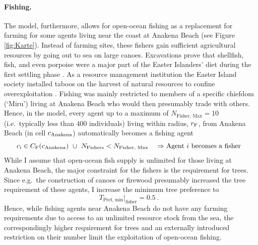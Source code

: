 \paragraph{Fishing.}
The model, furthermore, allows for open-ocean fishing as a replacement for farming for some agents living near the coast at Anakena Beach (see Figure \ref{fig:Karte}).
Instead of farming sites, these fishers gain sufficient agricultural resources by going out to sea on large canoes.
Excavations prove that shellfish, fish, and even porpoise were a major part of the Easter Islanders' diet during the first settling phase \citep{Bahn2017}.
As a resource management institution the Easter Island society installed taboos on the harvest of natural resources to confine overexploitation \citep{Good2006}. 
Fishing was mainly restricted to members of a specific chiefdom (`Miru') living at Anakena Beach \citep{Bahn2017} who would then presumably trade with others.
Hence, in the model, every agent up to a maximum of $N_\text{Fisher, Max} = 10$ (i.e.\ typically less than $400$ individuals) living within radius, $r_{\rm F}$, from Anakena Beach (in cell $c_{\rm Anakena}$) automatically becomes a fishing agent
\begin{equation}
 	c_{\rm i} \in C_{\rm F}(c_{\rm Anakena}) \  \cup \ N_\text{Fishers}<N_\text{Fisher, Max} \quad \Rightarrow \text{Agent }i\text{ becomes a fisher}
\end{equation}
While I assume that open-ocean fish supply is unlimited for those living at Anakena Beach, the major constraint for the fishers is the requirement for trees.
Since e.g.\ the construction of canoes or firewood presumably increased the tree requirement of these agents, I increase the minimum tree preference to
\begin{equation}
T_\text{Pref, min}|_\text{fisher} = 0.5 \ .
\end{equation} 
Hence, while fishing agents near Anakena Beach do not have any farming requirements due to access to an unlimited resource stock from the sea, the correspondingly higher requirement for trees and an externally introduced restriction on their number limit the exploitation of open-ocean fishing.

